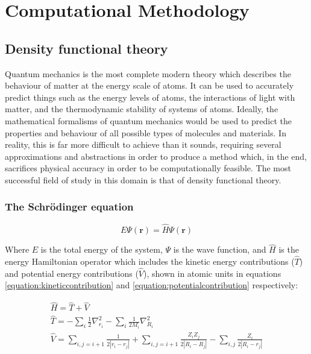 \chapter{Computational Methodology}

\label{ch:compmethodology}

\section{Density functional theory}

Quantum mechanics is the most complete modern theory which describes the behaviour of matter at the energy scale of atoms. It can be used to accurately predict things such as the energy levels of atoms, the interactions of light with matter, and the thermodynamic stability of systems of atoms. Ideally, the mathematical formalisms of quantum mechanics would be used to predict the properties and behaviour of all possible types of molecules and materials. In reality, this is far more difficult to achieve than it sounds, requiring several approximations and abstractions in order to produce a method which, in the end, sacrifices physical accuracy in order to be computationally feasible. The most successful field of study in this domain is that of density functional theory.

\subsection{The Schr\"{o}dinger equation}



\begin{equation}
E\Psi(\textbf{r}) = \hat{H}\Psi(\textbf{r})
\label{equation:schrodinger}
\end{equation}

Where $E$ is the total energy of the system, $\Psi$ is the wave function, and $\hat{H}$ is the energy Hamiltonian operator which includes the kinetic energy contributions ($\hat{T}$) and potential energy contributions ($\hat{V}$), shown in atomic units in equations \ref{equation:kineticcontribution} and \ref{equation:potentialcontribution} respectively:

\begin{gather}
\hat{H} = \hat{T} + \hat{V} \label{equation:hamiltonian}\\
\hat{T} = -\sum_i{\frac{1}{2}}\nabla^2_{r_i} - \sum_i{\frac{1}{2M_i}}\nabla^2_{R_i} \label{equation:kineticcontribution} \\
\hat{V} = \sum_{i,j=i+1}{\frac{1}{2|r_i - r_j|}} + \sum_{i,j=i+1}{\frac{Z_i Z_j}{2|R_i - R_j|}} - \sum_{i,j}{\frac{Z_i}{2|R_i - r_j|}} \label{equation:potentialcontribution}
\end{gather}


